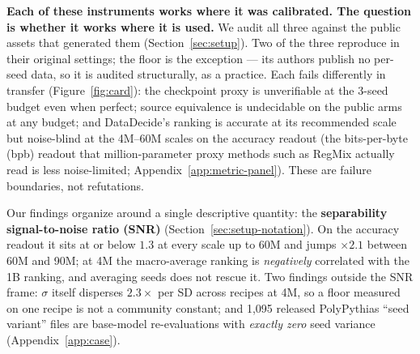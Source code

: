 \textbf{Each of these instruments works where it was calibrated. The question is whether it
works where it is used.} We audit all three against the public assets that generated them
(Section~\ref{sec:setup}). Two of the three reproduce in their original settings; the floor
is the exception --- its authors publish no per-seed data, so it is audited structurally, as
a practice. Each fails differently in
transfer (Figure~\ref{fig:card}): the checkpoint proxy is unverifiable at the 3-seed
budget even when perfect; source equivalence is undecidable on the public arms at any budget;
and DataDecide's ranking is accurate at its recommended scale but noise-blind at the 4M--60M
scales on the accuracy readout (the bits-per-byte (bpb) readout that million-parameter proxy
methods such as RegMix \citep{liu2024regmix} actually read is less noise-limited; Appendix~\ref{app:metric-panel}).
These are failure boundaries, not refutations.

Our findings organize around a single descriptive quantity: the \textbf{separability
signal-to-noise ratio (SNR)} (Section~\ref{sec:setup-notation}). On the accuracy
readout it sits at or below $1.3$ at every scale up to 60M and jumps ${\times}2.1$ between
60M and 90M; at 4M the macro-average ranking is \emph{negatively} correlated with the 1B
ranking, and averaging seeds does not rescue it. Two findings outside the SNR frame: $\sigma$ itself
disperses $2.3\times$ per SD across recipes at 4M, so a floor measured on one recipe is not a
community constant; and 1{,}095 released PolyPythias ``seed variant'' files
are base-model re-evaluations with \emph{exactly zero} seed variance (Appendix~\ref{app:case}).

